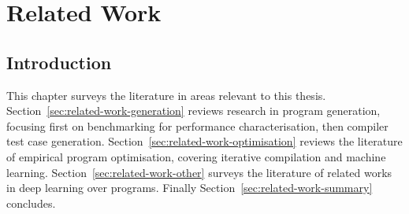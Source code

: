 \chapter{Related Work}
\label{chap:related-work}

\section{Introduction}

This chapter surveys the literature in areas relevant to this thesis.
Section~\ref{sec:related-work-generation} reviews research in program generation, focusing first on benchmarking for performance characterisation, then compiler test case generation. Section~\ref{sec:related-work-optimisation} reviews the literature of empirical program optimisation, covering iterative compilation and machine learning. Section~\ref{sec:related-work-other} surveys the literature of related works in deep learning over programs. Finally Section~\ref{sec:related-work-summary} concludes.


